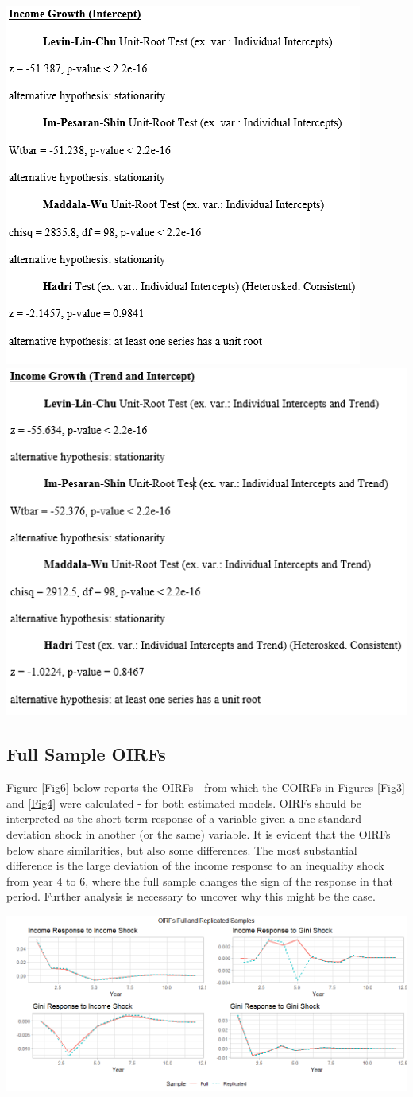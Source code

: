 \documentclass[11pt,preprint, authoryear]{elsarticle}
\let\origfigure\figure
\let\endorigfigure\endfigure
\renewenvironment{figure}[1][2] {
    \expandafter\origfigure\expandafter[H]
} {
    \endorigfigure
}
\numberwithin{equation}{section}
\numberwithin{figure}{section}
\numberwithin{table}{section}
\begin{document}
\begin{center}\includegraphics[width=0.49\linewidth,height=0.35\textheight]{images/Income_Growth_Intercept} \includegraphics[width=0.49\linewidth,height=0.35\textheight]{images/Income_Growth_Trend} \end{center}

\hypertarget{full-sample-oirfs}{%
\subsection{\texorpdfstring{Full Sample OIRFs
\label{B}}{Full Sample OIRFs }}\label{full-sample-oirfs}}

Figure \ref{Fig6} below reports the OIRFs - from which the COIRFs in
Figures \ref{Fig3} and \ref{Fig4} were calculated - for both estimated
models. OIRFs should be interpreted as the short term response of a
variable given a one standard deviation shock in another (or the same)
variable. It is evident that the OIRFs below share similarities, but
also some differences. The most substantial difference is the large
deviation of the income response to an inequality shock from year 4 to
6, where the full sample changes the sign of the response in that
period. Further analysis is necessary to uncover why this might be the
case.

\begin{figure}[H]
\includegraphics[width=1\linewidth]{images/Appendix_B_OIRFs_both_samples} \caption{\label{Fig6}}\label{fig:AppB}
\end{figure}


\end{document}
